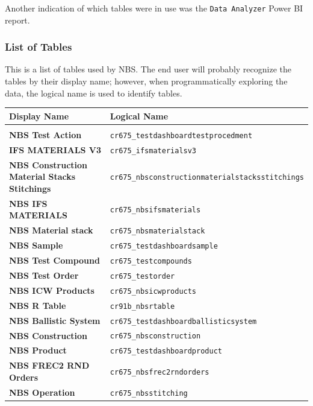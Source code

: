 Another indication of which tables were in use was the \texttt{Data Analyzer} Power BI report.

\newpage

\subsubsection{List of Tables}

This is a list of tables used by NBS. The end user will probably recognize the tables by their display name; however, when programmatically exploring the data, the logical name is used to identify tables.

\begin{footnotesize}
	\begin{tabularx}{\textwidth}{l|l}
		\textbf{Display Name} & \textbf{Logical Name} \\\hline\\
		\textbf{NBS Test Action} & \texttt{cr675\_testdashboardtestprocedment} \\[0.5em]
		\textbf{IFS MATERIALS V3} & \texttt{cr675\_ifsmaterialsv3} \\[0.5em]
		\textbf{NBS Construction Material Stacks Stitchings} & \texttt{cr675\_nbsconstructionmaterialstacksstitchings} \\[0.5em]
		\textbf{NBS IFS MATERIALS} & \texttt{cr675\_nbsifsmaterials} \\[0.5em]
		\textbf{NBS Material stack} & \texttt{cr675\_nbsmaterialstack} \\[0.5em]
		\textbf{NBS Sample} & \texttt{cr675\_testdashboardsample} \\[0.5em]
		\textbf{NBS Test Compound} & \texttt{cr675\_testcompounds} \\[0.5em]
		\textbf{NBS Test Order} & \texttt{cr675\_testorder} \\[0.5em]
		\textbf{NBS ICW Products} & \texttt{cr675\_nbsicwproducts} \\[0.5em]
		\textbf{NBS R Table} & \texttt{cr91b\_nbsrtable} \\[0.5em]
		\textbf{NBS Ballistic System} & \texttt{cr675\_testdashboardballisticsystem} \\[0.5em]
		\textbf{NBS Construction} & \texttt{cr675\_nbsconstruction} \\[0.5em]
		\textbf{NBS Product} & \texttt{cr675\_testdashboardproduct} \\[0.5em]
		\textbf{NBS FREC2 RND Orders} & \texttt{cr675\_nbsfrec2rndorders} \\[0.5em]
		\textbf{NBS Operation} & \texttt{cr675\_nbsstitching} \\[0.5em]

\end{tabularx}
\end{footnotesize}
